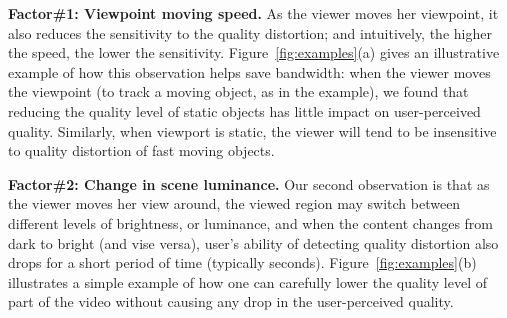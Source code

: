 \begin{packeditemize}

\item {\bf Factor\#1: Viewpoint moving speed.} 
As the viewer moves her viewpoint, it also reduces the sensitivity to the quality distortion; and intuitively, the higher the speed, the lower the sensitivity. 
Figure~\ref{fig:examples}(a) gives an illustrative example of how this observation helps save bandwidth: when the viewer moves the viewpoint (\eg to track a moving object, as in the example), we found that reducing the quality level of static objects has little impact on user-perceived quality.
Similarly, when viewport is static, the viewer will tend to be insensitive to quality distortion of fast moving objects. 


\item {\bf Factor\#2: Change in scene luminance.} 
Our second observation is that as the viewer moves her view around, the viewed region may switch between different levels of brightness, or luminance, and when the content changes from dark to bright (and vise versa), user's ability of detecting quality distortion also drops for a short period of time (typically \fillme seconds).
Figure~\ref{fig:examples}(b) illustrates a simple example of how one can carefully lower the quality level of part of the video without causing any drop in the user-perceived quality.



\end{packeditemize}
